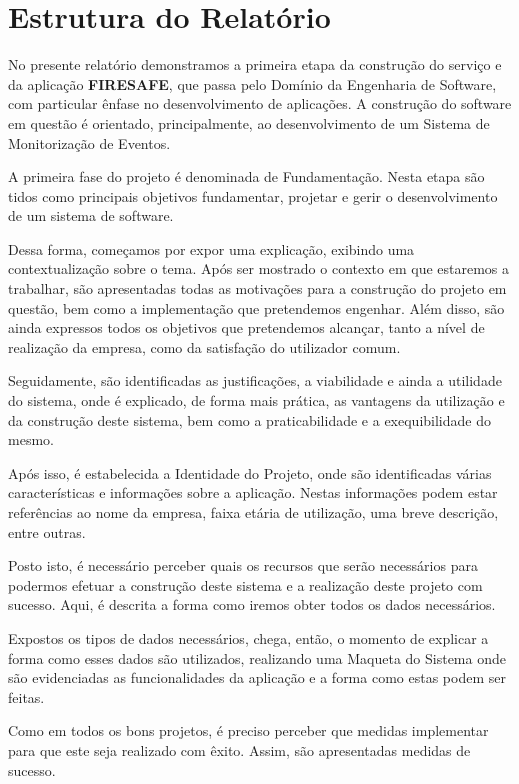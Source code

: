 \documentclass[a4paper,12pt]{scrreprt}
\newcommand{\tab}{
    \hspace{1cm}}
\begin{document}
    \section{Estrutura do Relatório}
        \tab No presente relatório demonstramos a primeira etapa da construção do serviço e da aplicação \textbf{FIRESAFE}, que passa pelo Domínio da Engenharia de Software, com particular ênfase no desenvolvimento de aplicações. A construção do software em questão é orientado, principalmente, ao desenvolvimento de um Sistema de Monitorização de Eventos.
        
        \tab A primeira fase do projeto é denominada de Fundamentação. Nesta etapa são tidos como principais objetivos fundamentar, projetar e gerir o desenvolvimento de um sistema de software.
        
        \tab Dessa forma, começamos por expor uma explicação, exibindo uma contextualização sobre o tema. Após ser mostrado o contexto em que estaremos a trabalhar, são apresentadas todas as motivações para a construção do projeto em questão, bem como a implementação que pretendemos engenhar. Além disso, são ainda expressos todos os objetivos que pretendemos alcançar, tanto a nível de realização da empresa, como da satisfação do utilizador comum.
        
        \tab Seguidamente, são identificadas as justificações, a viabilidade e ainda a utilidade do sistema, onde é explicado, de forma mais prática, as vantagens da utilização e da construção deste sistema, bem como a praticabilidade e a exequibilidade do mesmo.
        
        \tab Após isso, é estabelecida a Identidade do Projeto, onde são identificadas várias características e informações sobre a aplicação. Nestas informações podem estar referências ao nome da empresa, faixa etária de utilização, uma breve descrição, entre outras.
        
        \tab Posto isto, é necessário perceber quais os recursos que serão necessários para podermos efetuar a construção deste sistema e a realização deste projeto com sucesso. Aqui, é descrita a forma como iremos obter todos os dados necessários.

        \tab Expostos os tipos de dados necessários, chega, então, o momento de explicar a forma como esses dados são utilizados, realizando uma Maqueta do Sistema onde são evidenciadas as funcionalidades da aplicação e a forma como estas podem ser feitas.
        
        \tab Como em todos os bons projetos, é preciso perceber que medidas implementar para que este seja realizado com êxito. Assim, são apresentadas medidas de sucesso.
        
\end{document}
